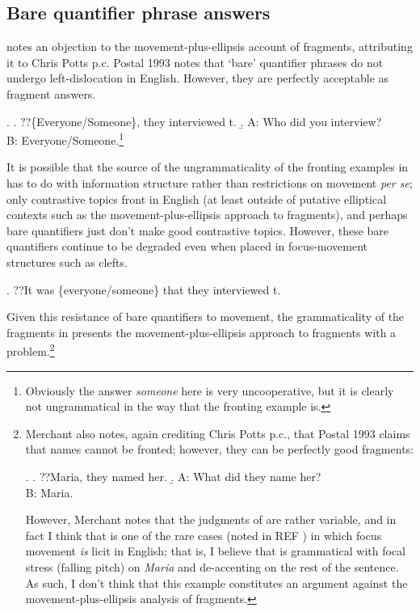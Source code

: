 \documentclass[11pt,letterpaper]{article}
\begin{document}
\subsection{Bare quantifier phrase answers}

\cite{Me04} notes an objection to the movement-plus-ellipsis account of fragments, attributing it to Chris Potts p.c. Postal 1993 %
notes that `bare' quantifier phrases do not undergo left-dislocation in English. However, they are perfectly acceptable as fragment answers.

\ex. 	\a. ??\{Everyone/Someone\}, they interviewed t.
	\b. A: Who did you interview?\\
		B: Everyone/Someone.\footnote{Obviously the answer {\it someone} here is very uncooperative, but it is clearly not ungrammatical in the way that the fronting example is.}
		
It is possible that the source of the ungrammaticality of the fronting examples in \Last[a] has to do with information structure rather than restrictions on movement {\it per se}; only contrastive topics front in English (at least outside of putative elliptical contexts such as the movement-plus-ellipsis approach to fragments), and perhaps bare quantifiers just don't make good contrastive topics. However, these bare quantifiers continue to be degraded even when placed in focus-movement structures such as clefts.

\ex. 	??It was \{everyone/someone\} that they interviewed t.

Given this resistance of bare quantifiers to movement, the grammaticality of the fragments in \Last[b] presents the movement-plus-ellipsis approach to fragments with a problem.\footnote{Merchant also notes, again crediting Chris Potts p.c., that Postal 1993 %
claims that names cannot be fronted; however, they can be perfectly good fragments:

\ex. 	\a. ??Maria, they named her.
	\b. A: What did they name her?\\
		B: Maria.
		
However, Merchant notes that the judgments of \Last[a] are rather variable, and in fact I think that \Last[a] is one of the rare cases (noted in REF %
) in which focus movement \emph{is} licit in English; that is, I believe that \Last[a] is grammatical with focal stress (falling pitch) on {\it Maria} and de-accenting on the rest of the sentence.
As such, I don't think that this example constitutes an argument against the movement-plus-ellipsis analysis of fragments.}
\end{document}
